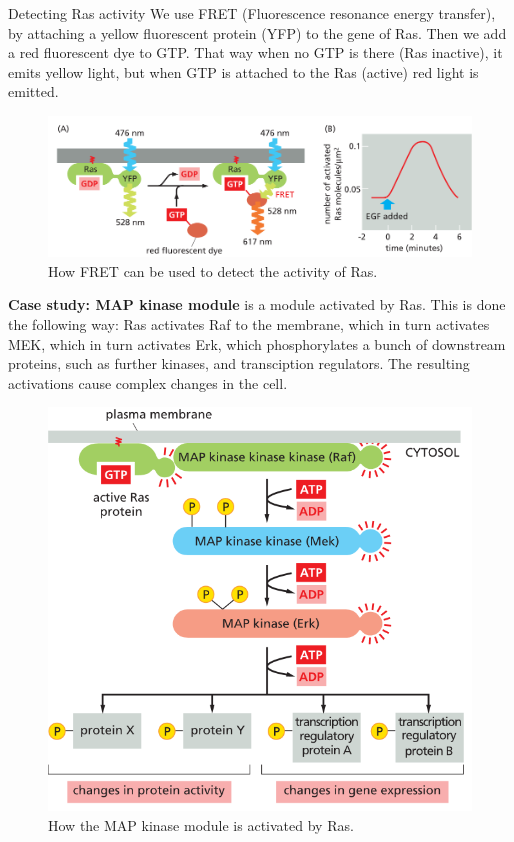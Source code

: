 \documentclass[../main.tex]{subfiles}
\begin{document}
\begin{RemarkWithTitel}{Detecting Ras activity}
	We use \gls{FRET} (Fluorescence resonance energy  transfer), by attaching a yellow fluorescent protein (YFP) to the gene of Ras. Then we add a red fluorescent dye to GTP. That way when no GTP is there (Ras inactive), it emits yellow light, but when GTP is attached to the Ras (active) red light is emitted.
\end{RemarkWithTitel}


\begin{figure}[H]
	\centering
	\includegraphics[height=0.3\textwidth]{Ras_FRET}
	\caption{How FRET can be used to detect the activity of Ras.}
\end{figure}

\textbf{Case study: \gls{MAP} kinase module} is a module activated by \gls{Ras}. This is done the following way: Ras activates \gls{Raf} to the membrane, which in turn activates \gls{MEK}, which in turn activates \gls{Erk}, which phosphorylates a bunch of downstream proteins, such as further kinases, and transciption regulators. The resulting activations cause complex changes in the cell.
\begin{figure}[H]
	\centering
	\includegraphics[height=0.4\textwidth]{Ras_MAP}
	\caption{How the MAP kinase module is activated by Ras.}
\end{figure}
\end{document}
